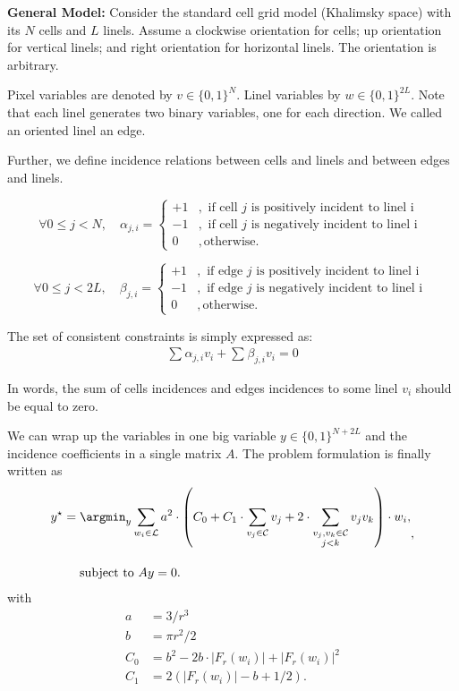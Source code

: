 \textbf{General Model:} 	Consider the standard cell grid model (Khalimsky space) with its $N$ cells and $L$ linels. Assume a clockwise orientation for cells; up orientation for vertical linels; and right orientation for horizontal linels. The orientation is arbitrary. 
	
	Pixel variables are denoted by $v \in \{0,1\}^N$. Linel variables by $w \in \{0,1\}^{2L}$. Note that each linel generates two binary variables, one for each direction. We called an oriented linel an edge.
			
	Further, we define incidence relations between cells and linels and between edges and linels.
	
	\[ \forall 0 \leq j < N, \quad
			\alpha_{j,i} = \left\{ 		\begin{array}{ll}
											+1&, \text{ if cell $j$ is positively incident to linel i }\\
											-1&,\text{ if cell $j$ is negatively incident to linel i }\\
											0&,\text{otherwise}.						
										\end{array}\right.
	\]
	
	\[\forall 0 \leq j < 2L, \quad
			\beta_{j,i} = \left\{ 		\begin{array}{ll}
											+1&, \text{ if edge $j$ is positively incident to linel i }\\
											-1&,\text{ if edge $j$ is negatively incident to linel i }\\
											0&,\text{otherwise}.						
										\end{array}\right.
	\]	

	The set of consistent constraints is simply expressed as:
	\begin{align*}
		\sum_{}{\alpha_{j,i}v_i} + \sum_{}{\beta_{j,i}v_i} = 0
	\end{align*}
	
	In words, the sum of cells incidences and edges incidences to some linel $v_i$ should be equal to zero. 
	
	We can wrap up the variables in one big variable $y \in \{0,1\}^{N+2L}$ and the incidence coefficients in a single matrix $A$. The problem formulation is finally written as
	\begin{equation}
	\begin{aligned}
		y^\star &= \argmin_{y} \sum_{w_i \in \mathcal{L}}{ a^2 \cdot \left( C_0 + C_1 \cdot \sum_{v_j \in \mathcal{C}}{v_j} + 2 \cdot \sum_{ \substack{v_j,v_k \in \mathcal{C} \\ j<k} }{v_jv_k}  \right) } \cdot w_i,\\[1em]
	&\quad \text{ subject to } Ay=0.
	\end{aligned},
	\label{eq:global-formulation}
	\end{equation}
%	
	with 
	\begin{align*}
		a &= 3/r^3 \\ 
		b &= \pi r^2/2 \\ 
		C_0 &= b^2 - 2b \cdot |F_r(w_i)| + |F_r(w_i)|^2 \\
		C_1 &= 2\left( |F_r(w_i)| - b + 1/2 \right).
	\end{align*}
%
%
